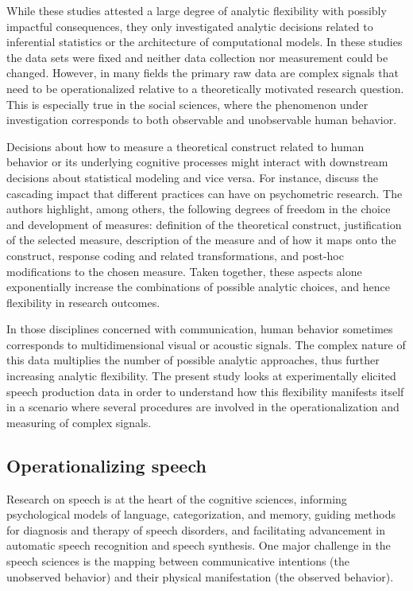 \documentclass[Review,times,sageh]{sagej}
\begin{document}
While these studies attested a large degree of analytic flexibility with possibly impactful consequences, they only investigated analytic decisions related to inferential statistics or the architecture of computational models.
In these studies the data sets were fixed and neither data collection nor measurement could be changed.
However, in many fields the primary raw data are complex signals that need to be operationalized relative to a theoretically motivated research question.
This is especially true in the social sciences, where the phenomenon under investigation corresponds to both observable and unobservable human behavior.

Decisions about how to measure a theoretical construct related to human behavior or its underlying cognitive processes might interact with downstream decisions about statistical modeling and vice versa.
For instance, \citet{flake2020} discuss the cascading impact that different practices can have on psychometric research.
The authors highlight, among others, the following degrees of freedom in the choice and development of measures: definition of the theoretical construct, justification of the selected measure, description of the measure and of how it maps onto the construct, response coding and related transformations, and post-hoc modifications to the chosen measure.
Taken together, these aspects alone exponentially increase the combinations of possible analytic choices, and hence flexibility in research outcomes.

In those disciplines concerned with communication, human behavior sometimes corresponds to multidimensional visual or acoustic signals.
The complex nature of this data multiplies the number of possible analytic approaches, thus further increasing analytic flexibility.
The present study looks at experimentally elicited speech production data in order to understand how this flexibility manifests itself in a scenario where several procedures are involved in the operationalization and measuring of complex signals.

\hypertarget{s:operspeech}{%
\subsection{Operationalizing speech}\label{s:operspeech}}

Research on speech is at the heart of the cognitive sciences, informing psychological models of language, categorization, and memory, guiding methods for diagnosis and therapy of speech disorders, and facilitating advancement in automatic speech recognition and speech synthesis.
One major challenge in the speech sciences is the mapping between communicative intentions (the unobserved behavior) and their physical manifestation (the observed behavior).
\end{document}
